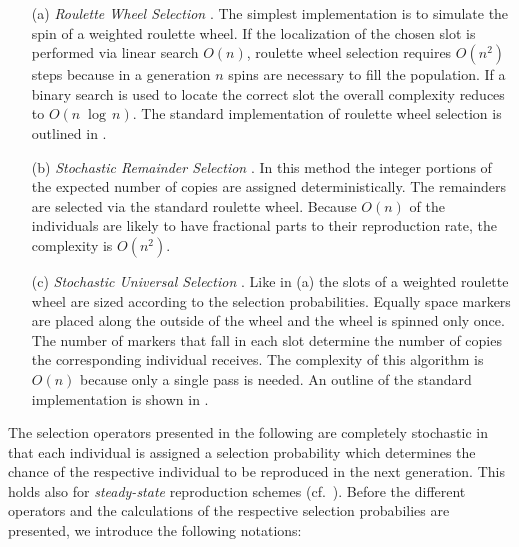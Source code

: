 \begin{itemize}
  \item[(a)] \emph{Roulette Wheel Selection}
             \cite{Jong:75,Goldberg:89}. The simplest implementation
             is to simulate the spin of a weighted roulette wheel.  If
             the localization of the chosen slot is performed via
             linear search $O(n)$, roulette wheel selection requires
             $O(n^2)$ steps because in a generation $n$ spins are
             necessary to fill the population.  If a binary search is
             used to locate the correct slot the overall complexity
             reduces to $O(n\;\log\,n)$.  The standard implementation
             of roulette wheel selection is outlined in
             .

  \item[(b)] \emph{Stochastic Remainder Selection}
             \cite{Booker:82}. In this method the integer portions of
             the expected number of copies are assigned
             deterministically.  The remainders are selected via the
             standard roulette wheel.  Because $O(n)$ of the
             individuals are likely to have fractional parts to their
             reproduction rate, the complexity is $O(n^2)$.

  \item[(c)] \emph{Stochastic Universal Selection}
             \cite{Baker:87,Grefenstette:89}. Like in (a) the slots of
             a weighted roulette wheel are sized according to the
             selection probabilities. Equally space markers are placed
             along the outside of the wheel and the wheel is spinned
             only once.  The number of markers that fall in each slot
             determine the number of copies the corresponding
             individual receives.  The complexity of this algorithm is
             $O(n)$ because only a single pass is needed.  An outline
             of the standard implementation is shown in
             .

\end{itemize}

\noindent The selection operators presented in the following are completely
stochastic in that each individual is assigned a selection probability
which determines the chance of the respective individual to be
reproduced in the next generation.  This holds also for
\emph{steady-state} reproduction schemes
(cf.~).  Before the
different operators and the calculations of the respective selection
probabilies are presented, we introduce the following notations:

